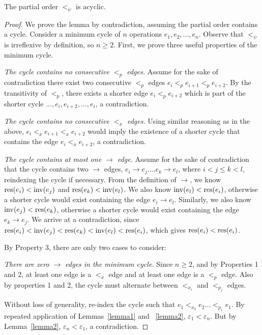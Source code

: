 \begin{lem}
\label{lemmamain}
The partial order $<_\psi$ is acyclic.
\end{lem}
\begin{proof}
We prove the lemma by contradiction, assuming the partial order contains a cycle. Consider a minimum cycle of $n$ operations $e_1,e_2,...,e_n$. Observe that $<_\psi$ is irreflexive by definition, so $n \geq 2$. First, we prove three useful properties of the minimum cycle.

 \textit{The cycle contains no consecutive $<_p$ edges.} {Assume for the sake of contradiction there exist two consecutive $<_p$ edges $e_i <_p e_{i+1} <_p e_{i+2}$. By the transitivity of $<_p$, there exists a shorter edge $e_i <_p e_{i+2}$ which is part of the shorter cycle $..., e_i, e_{i+2}, ..., e_i$, a contradiction.}

 \textit{The cycle contains no consecutive $<_x$ edges.} {Using similar reasoning as in the above, $e_i <_x e_{i+1} <_x e_{i+2}$ would imply the existence of a shorter cycle that contains the edge $e_i <_x e_{i+2}$, a contradiction.}

 \textit{The cycle contains at most one $\rightarrow$ edge.} Assume for the sake of contradiction that the cycle contains two $\rightarrow$ edges, $e_i \rightarrow e_j .... e_k \rightarrow e_l$, where $i < j \leq k < l$, reindexing the cycle if necessary. From the definition of $\rightarrow$, we know $\operatorname{\operatorname{res}}(e_i) < \operatorname{inv}(e_j)$ and $\operatorname{\operatorname{res}}(e_k) < \operatorname{inv}(e_l)$. We also know $\operatorname{inv}(e_l) < \operatorname{\operatorname{res}}(e_i)$, otherwise a shorter cycle would exist containing the edge $e_i \rightarrow e_l$. Similarly, we also know $\operatorname{inv}(e_j) < \operatorname{\operatorname{res}}(e_k)$, otherwise a shorter cycle would exist containing the edge $e_k \rightarrow e_j$. We arrive at a contradiction, since $\operatorname{\operatorname{res}}(e_i) < \operatorname{inv}(e_j) < \operatorname{\operatorname{res}}(e_k) < \operatorname{inv}(e_l) < \operatorname{\operatorname{res}}(e_i)$, which gives $\operatorname{\operatorname{res}}(e_i) < \operatorname{\operatorname{res}}(e_i)$.

By Property 3, there are only two cases to consider:

 \textit{There are zero $\rightarrow$ edges in the minimum cycle.} Since $n \geq 2$, and by Properties 1 and 2, at least one edge is a $<_x$ edge and at least one edge is a $<_p$ edge. Also by properties 1 and 2, the cycle must alternate between $<_{x_i}$ and $<_{p_j}$ edges. 

Without loss of generality, re-index the cycle such that $e_1 <_{x_2} e_2 ... <_{p_1} e_1$. By repeated application of Lemmas~\ref{lemma1} and ~\ref{lemma2}, $\varepsilon_1 < \varepsilon_n$. But by Lemma~\ref{lemma2}, $\varepsilon_n < \varepsilon_1$, a contradiction.


\end{proof}
